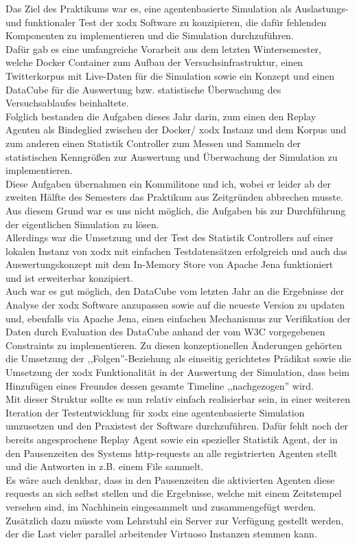 \documentclass{article}
\begin{document}
Das Ziel des Praktikums war es, eine agentenbasierte Simulation als Auslastungs- und funktionaler Test der xodx Software zu konzipieren, die dafür fehlenden Komponenten zu implementieren und die Simulation durchzuführen.\\
Dafür gab es eine umfangreiche Vorarbeit aus dem letzten Wintersemester, welche Docker Container zum Aufbau der Versuchsinfrastruktur, einen Twitterkorpus mit Live-Daten für die Simulation sowie ein Konzept und einen DataCube für die Auswertung bzw. statistische Überwachung des Versuchsablaufes beinhaltete.\\
Folglich bestanden die Aufgaben dieses Jahr darin, zum einen den Replay Agenten als Bindeglied zwischen der Docker/ xodx Instanz und dem Korpus und zum anderen einen Statistik Controller zum Messen und Sammeln der statistischen Kenngrößen zur Auswertung und Überwachung der Simulation zu implementieren.\\
Diese Aufgaben übernahmen ein Kommilitone und ich, wobei er leider ab der zweiten Hälfte des Semesters das Praktikum aus Zeitgründen abbrechen musste. Aus diesem Grund war es uns nicht möglich, die Aufgaben bis zur Durchführung der eigentlichen Simulation zu lösen.\\
Allerdings war die Umsetzung und der Test des Statistik Controllers auf einer lokalen Instanz von xodx mit einfachen Testdatensätzen erfolgreich und auch das Auswertungskonzept mit dem In-Memory Store von Apache Jena funktioniert und ist erweiterbar konzipiert.\\
Auch war es gut möglich, den DataCube vom letzten Jahr an die Ergebnisse der Analyse der xodx Software anzupassen sowie auf die neueste Version zu updaten und, ebenfalls via Apache Jena, einen einfachen Mechanismus zur Verifikation der Daten durch Evaluation des DataCube anhand der vom W3C vorgegebenen Constraints zu implementieren. Zu diesen konzeptionellen Änderungen gehörten die Umsetzung der ,,Folgen''-Beziehung als einseitig gerichtetes Prädikat sowie die Umsetzung der xodx Funktionalität in der Auswertung der Simulation, dass beim Hinzufügen eines Freundes dessen gesamte Timeline ,,nachgezogen'' wird.\\
Mit dieser Struktur sollte es nun relativ einfach realisierbar sein, in einer weiteren Iteration der Testentwicklung für xodx eine agentenbasierte Simulation umzusetzen und den Praxistest der Software durchzuführen. Dafür fehlt noch der bereits angesprochene Replay Agent sowie ein spezieller Statistik Agent, der in den Pausenzeiten des Systems http-requests an alle registrierten Agenten stellt und die Antworten in z.B. einem File sammelt.\\
Es wäre auch denkbar, dass in den Pausenzeiten die aktivierten Agenten diese requests an sich selbst stellen und die Ergebnisse, welche mit einem Zeitstempel versehen sind, im Nachhinein eingesammelt und zusammengefügt werden. Zusätzlich dazu müsste vom Lehrstuhl ein Server zur Verfügung gestellt werden, der die Last vieler parallel arbeitender Virtuoso Instanzen stemmen kann.



\end{document}
